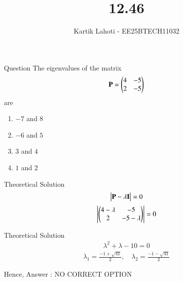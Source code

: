 \documentclass{beamer}
\title %
{12.46}
\author 
{Kartik Lahoti - EE25BTECH11032}
\begin{document}
\frame{\titlepage}
\begin{frame}{Question}
The eigenvalues of the matrix
\begin{align}
    \mathbf{P} = \begin{pmatrix}4 & -5 \\ 2 & -5\end{pmatrix}
\end{align}
are 
\begin{multicols}
\begin{enumerate}
        \item $-7$ and $8$
        \item $-6$ and $5$
        \item $3$ and $4$
        \item $1$ and $2$
    
\end{enumerate}
\end{multicols}

\end{frame}


\begin{frame}{Theoretical Solution}
\begin{align}
    \begin{vmatrix}\mathbf{P} - \lambda\mathbf{I}\end{vmatrix} = 0
\end{align}
\begin{align}
    \begin{vmatrix}\begin{pmatrix}4-\lambda & -5 \\ 2 & -5-\lambda\end{pmatrix}\end{vmatrix} = 0 
\end{align}
\end{frame}
\begin{frame}{Theoretical Solution}
\begin{align}
    \lambda^2 + \lambda -10 = 0
\end{align}
\begin{align}
    \lambda_1 = \frac{-1+\sqrt{41}}{2}, \quad 
    \lambda_2 = \frac{-1-\sqrt{41}}{2}
\end{align}

Hence, Answer : NO CORRECT OPTION
\end{frame}

\end{document}
